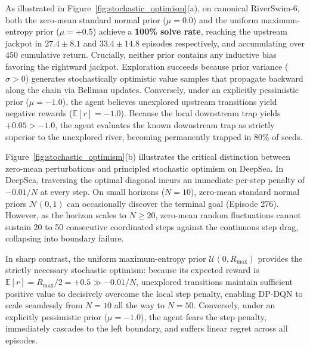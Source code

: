 \documentclass[10pt]{article}
\begin{document}
As illustrated in Figure~\ref{fig:stochastic_optimism}(a), on canonical RiverSwim-6, both the zero-mean standard normal prior ($\mu=0.0$) and the uniform maximum-entropy prior ($\mu=+0.5$) achieve a \textbf{100\% solve rate}, reaching the upstream jackpot in $27.4 \pm 8.1$ and $33.4 \pm 14.8$ episodes respectively, and accumulating over $450$ cumulative return. Crucially, neither prior contains any inductive bias favoring the rightward jackpot. Exploration succeeds because prior variance ($\sigma > 0$) generates stochastically optimistic value samples that propagate backward along the chain via Bellman updates. Conversely, under an explicitly pessimistic prior ($\mu = -1.0$), the agent believes unexplored upstream transitions yield negative rewards ($\mathbb{E}[r] = -1.0$). Because the local downstream trap yields $+0.05 > -1.0$, the agent evaluates the known downstream trap as strictly superior to the unexplored river, becoming permanently trapped in 80\% of seeds.

Figure~\ref{fig:stochastic_optimism}(b) illustrates the critical distinction between zero-mean perturbations and principled stochastic optimism on DeepSea. In DeepSea, traversing the optimal diagonal incurs an immediate per-step penalty of $-0.01/N$ at every step. On small horizons ($N=10$), zero-mean standard normal priors $\mathcal{N}(0, 1)$ can occasionally discover the terminal goal (Episode 276). However, as the horizon scales to $N \ge 20$, zero-mean random fluctuations cannot sustain 20 to 50 consecutive coordinated steps against the continuous step drag, collapsing into boundary failure. 

In sharp contrast, the uniform maximum-entropy prior $\mathcal{U}(0, R_{\max})$ provides the strictly necessary stochastic optimism: because its expected reward is $\mathbb{E}[r] = R_{\max} / 2 = +0.5 \gg -0.01/N$, unexplored transitions maintain sufficient positive value to decisively overcome the local step penalty, enabling DP-DQN to scale seamlessly from $N=10$ all the way to $N=50$. Conversely, under an explicitly pessimistic prior ($\mu = -1.0$), the agent fears the step penalty, immediately cascades to the left boundary, and suffers linear regret across all episodes.
\end{document}
